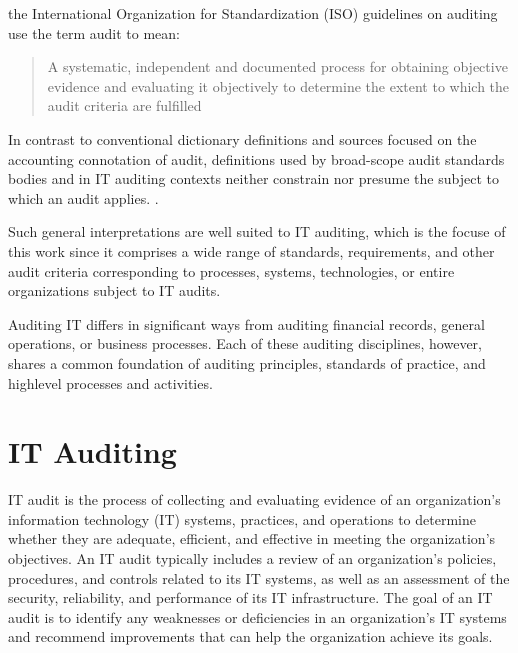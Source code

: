 the International Organization for Standardization (ISO) guidelines on auditing use the term audit to mean: \begin{quote} A systematic, independent and documented process for obtaining objective evidence and evaluating it objectively to determine the extent to which the audit criteria are fulfilled \end{quote}


In contrast to conventional dictionary definitions and sources focused on
the accounting connotation of audit, definitions used by broad-scope audit standards bodies and in IT auditing contexts neither constrain nor presume the subject to which an audit applies. \citep{GANTZ20141}.

Such general interpretations are well suited to IT auditing, which is the focuse of this work since it comprises a wide range of standards, requirements, and other audit criteria corresponding to processes, systems, technologies, or entire organizations subject to IT audits.

Auditing IT differs in significant ways from auditing financial records, general operations, or business processes. Each of these auditing disciplines, however,
shares a common foundation of auditing principles, standards of practice, and highlevel processes and activities.


\section{IT Auditing}\label{sec:adt:it-audit}

IT audit is the process of collecting and evaluating evidence of an organization's information technology (IT) systems, practices, and operations to determine whether they are adequate, efficient, and effective in meeting the organization's objectives. An IT audit typically includes a review of an organization's policies, procedures, and controls related to its IT systems, as well as an assessment of the security, reliability, and performance of its IT infrastructure. The goal of an IT audit is to identify any weaknesses or deficiencies in an organization's IT systems and recommend improvements that can help the organization achieve its goals.

